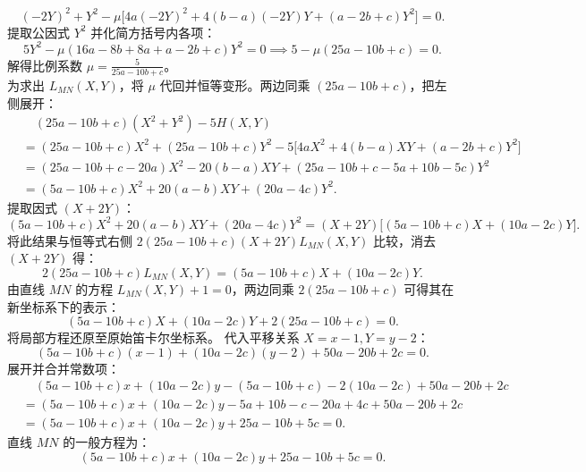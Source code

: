 \begin{solution}
\[ (-2Y)^2 + Y^2 - \mu \big[ 4a(-2Y)^2 + 4(b - a)(-2Y)Y + (a - 2b + c)Y^2 \big] = 0. \]
提取公因式 $Y^2$ 并化简方括号内各项：
\[ 5Y^2 - \mu (16a - 8b + 8a + a - 2b + c)Y^2 = 0 \implies 5 - \mu (25a - 10b + c) = 0. \]
解得比例系数 $\mu = \frac{5}{25a - 10b + c}$。\\
为求出 $L_{MN}(X,Y)$，将 $\mu$ 代回并恒等变形。两边同乘 $(25a - 10b + c)$，把左侧展开：
\begin{align*}
&\quad (25a - 10b + c)(X^2 + Y^2) - 5 H(X,Y) \\
&= (25a - 10b + c)X^2 + (25a - 10b + c)Y^2 - 5 \big[ 4a X^2 + 4(b - a) XY + (a - 2b + c) Y^2 \big] \\
&= (25a - 10b + c - 20a) X^2 - 20(b - a) XY + (25a - 10b + c - 5a + 10b - 5c) Y^2 \\
&= (5a - 10b + c) X^2 + 20(a - b) XY + (20a - 4c) Y^2.
\end{align*}
提取因式 $(X + 2Y)$：
\[ (5a - 10b + c) X^2 + 20(a - b) XY + (20a - 4c) Y^2 = (X + 2Y) \big[ (5a - 10b + c)X + (10a - 2c)Y \big]. \]
将此结果与恒等式右侧 $2(25a - 10b + c)(X + 2Y) L_{MN}(X,Y)$ 比较，消去 $(X + 2Y)$ 得：
\[ 2(25a - 10b + c) L_{MN}(X,Y) = (5a - 10b + c)X + (10a - 2c)Y. \]
由直线 $MN$ 的方程 $L_{MN}(X,Y) + 1 = 0$，两边同乘 $2(25a - 10b + c)$ 可得其在新坐标系下的表示：
\[ (5a - 10b + c)X + (10a - 2c)Y + 2(25a - 10b + c) = 0. \]
将局部方程还原至原始笛卡尔坐标系。
代入平移关系 $X = x - 1, Y = y - 2$：
\[ (5a - 10b + c)(x - 1) + (10a - 2c)(y - 2) + 50a - 20b + 2c = 0. \]
展开并合并常数项：
\begin{align*}
&\quad (5a - 10b + c)x + (10a - 2c)y - (5a - 10b + c) - 2(10a - 2c) + 50a - 20b + 2c \\
&= (5a - 10b + c)x + (10a - 2c)y - 5a + 10b - c - 20a + 4c + 50a - 20b + 2c \\
&= (5a - 10b + c)x + (10a - 2c)y + 25a - 10b + 5c = 0.
\end{align*}
直线 $MN$ 的一般方程为：
\[ (5a - 10b + c)x + (10a - 2c)y + 25a - 10b + 5c = 0. \]

\end{solution}




